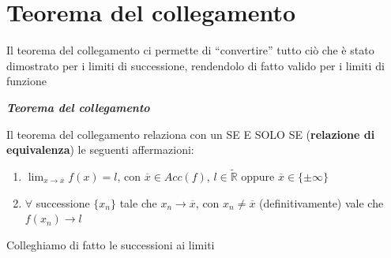 \documentclass{article}
\theoremstyle{definition}
\newcommand{\virgolette}[1]{``#1''}
\begin{document}
\section{Teorema del collegamento}
Il teorema del collegamento ci permette di \virgolette{convertire} tutto ciò che è stato dimostrato per i limiti di successione, rendendolo di fatto valido per i limiti di funzione
\begin{center}
    \textbf{\textit{Teorema del collegamento}}
\end{center}
Il teorema del collegamento relaziona con un SE E SOLO SE (\textbf{relazione di equivalenza}) le seguenti affermazioni:
\begin{enumerate}
    \item $\lim_{x \to \overline{x}}f(x)=l$, con $\overline{x} \in Acc(f)$, $l \in \tilde{\mathbb{R}}$ oppure $\overline{x} \in \{\pm\infty\}$
    \item $\forall$ successione $\{x_n\}$ tale che $x_n \to \overline{x}$, con $x_n \neq \overline{x}$ (definitivamente) vale che $f(x_n) \to l$

\end{enumerate}
Colleghiamo di fatto le successioni ai limiti
\end{document}
